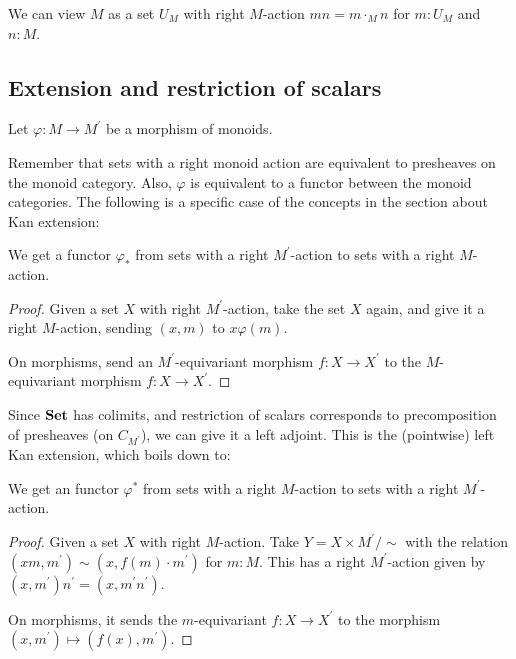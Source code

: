 \begin{definition}
  We can view $ M $ as a set $ U_M $ with right $ M $-action $ m n = m \cdot_M n $ for $ m: U_M $ and $ n: M $.
\end{definition}

\subsection{Extension and restriction of scalars}

Let $ \varphi: M \to M^\prime $ be a morphism of monoids.

Remember that sets with a right monoid action are equivalent to presheaves on the monoid category. Also, $ \varphi $ is equivalent to a functor between the monoid categories. The following is a specific case of the concepts in the section about Kan extension:

\begin{lemma}
  We get a  functor $ \varphi_* $ from sets with a right $ M^\prime $-action to sets with a right $ M $-action.
\end{lemma}
\begin{proof}
  Given a set $ X $ with right $ M^\prime $-action, take the set $ X $ again, and give it a right $ M $-action, sending $ (x, m) $ to $ x \varphi(m) $.

  On morphisms, send an $ M^\prime $-equivariant morphism $ f: X \to X^\prime $ to the $ M $-equivariant morphism $ f: X \to X^\prime $.
\end{proof}

Since $ \mathbf{Set} $ has colimits, and restriction of scalars corresponds to precomposition of presheaves (on $ C_{M^\prime} $), we can give it a left adjoint. This is the (pointwise) left Kan extension, which boils down to:

\begin{lemma}
  We get an  functor $ \varphi^* $ from sets with a right $ M $-action to sets with a right $ M^\prime $-action.
\end{lemma}
\begin{proof}
  Given a set $ X $ with right $ M $-action. Take $ Y = X \times M^\prime / \sim $ with the relation $ (x m, m^\prime) \sim (x, f(m) \cdot m^\prime) $ for $ m: M $. This has a right $ M^\prime $-action given by $ (x, m^\prime)n^\prime = (x, m^\prime n^\prime) $.

  On morphisms, it sends the $ m $-equivariant $ f: X \to X^\prime $ to the morphism $ (x, m^\prime) \mapsto (f(x), m^\prime) $.
\end{proof}

